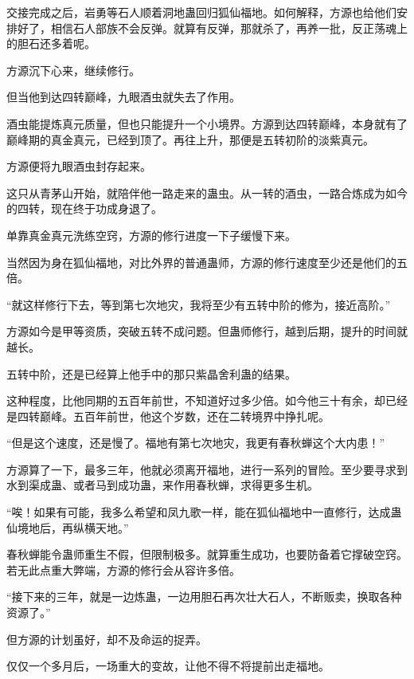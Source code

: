 \begin{this_body}
交接完成之后，岩勇等石人顺着洞地蛊回归狐仙福地。如何解释，方源也给他们安排好了，相信石人部族不会反弹。就算有反弹，那就杀了，再养一批，反正荡魂上的胆石还多着呢。

方源沉下心来，继续修行。

但当他到达四转巅峰，九眼酒虫就失去了作用。

酒虫能提炼真元质量，但也只能提升一个小境界。方源到达四转巅峰，本身就有了巅峰期的真金真元，已经到顶了。再往上升，那便是五转初阶的淡紫真元。

方源便将九眼酒虫封存起来。

这只从青茅山开始，就陪伴他一路走来的蛊虫。从一转的酒虫，一路合炼成为如今的四转，现在终于功成身退了。

单靠真金真元洗练空窍，方源的修行进度一下子缓慢下来。

当然因为身在狐仙福地，对比外界的普通蛊师，方源的修行速度至少还是他们的五倍。

“就这样修行下去，等到第七次地灾，我将至少有五转中阶的修为，接近高阶。”

方源如今是甲等资质，突破五转不成问题。但蛊师修行，越到后期，提升的时间就越长。

五转中阶，还是已经算上他手中的那只紫晶舍利蛊的结果。

这种程度，比他同期的五百年前世，不知道好过多少倍。如今他三十有余，却已经是四转巅峰。五百年前世，他这个岁数，还在二转境界中挣扎呢。

“但是这个速度，还是慢了。福地有第七次地灾，我更有春秋蝉这个大内患！”

方源算了一下，最多三年，他就必须离开福地，进行一系列的冒险。至少要寻求到水到渠成蛊、或者马到成功蛊，来作用春秋蝉，求得更多生机。

“唉！如果有可能，我多么希望和凤九歌一样，能在狐仙福地中一直修行，达成蛊仙境地后，再纵横天地。”

春秋蝉能令蛊师重生不假，但限制极多。就算重生成功，也要防备着它撑破空窍。若无此点重大弊端，方源的修行会从容许多倍。

“接下来的三年，就是一边炼蛊，一边用胆石再次壮大石人，不断贩卖，换取各种资源了。”

但方源的计划虽好，却不及命运的捉弄。

仅仅一个多月后，一场重大的变故，让他不得不将提前出走福地。

\end{this_body}

